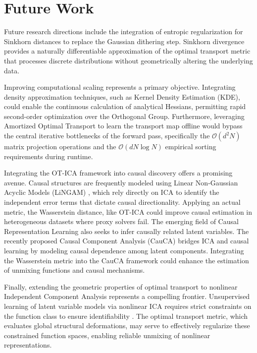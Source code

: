 \documentclass[12pt,a4paper,twoside,openany]{book}
\begin{document}
\section{Future Work}
Future research directions include the integration of entropic regularization for Sinkhorn distances \cite{cuturi2013sinkhorn, peyre2019computational} 
to replace the Gaussian dithering step. Sinkhorn divergence provides a naturally differentiable approximation of the optimal transport metric 
that processes discrete distributions without geometrically altering the underlying data.

Improving computational scaling represents a primary objective. Integrating density approximation techniques, 
such as Kernel Density Estimation (KDE), could enable the continuous calculation of analytical Hessians, 
permitting rapid second-order optimization over the Orthogonal Group. Furthermore, 
leveraging Amortized Optimal Transport to learn the transport map offline would bypass the central 
iterative bottlenecks of the forward pass, specifically the $\mathcal{O}(d^2 N)$ matrix projection operations and 
the $\mathcal{O}(d N \log N)$ empirical sorting requirements during runtime.

Integrating the OT-ICA framework into causal discovery offers a promising avenue. Causal structures are frequently modeled using 
Linear Non-Gaussian Acyclic Models (LiNGAM) \cite{shimizu2006linear}, which rely directly on ICA to identify the independent error terms 
that dictate causal directionality. Applying an actual metric, the Wasserstein distance, like OT-ICA could improve causal estimation in heterogeneous 
datasets where proxy solvers fail. The emerging field of Causal Representation Learning also seeks to infer causally 
related latent variables. The recently proposed Causal Component Analysis (CauCA) \cite{liang2023causal} bridges ICA and causal learning by modeling 
causal dependence among latent components. Integrating the Wasserstein metric into the CauCA framework could 
enhance the estimation of unmixing functions and causal mechanisms.

Finally, extending the geometric properties of optimal transport to nonlinear Independent Component Analysis represents a compelling frontier. 
Unsupervised learning of latent variable models via nonlinear ICA requires strict constraints on the function class to 
ensure identifiability \cite{buchholz2022function}. The optimal transport metric, which evaluates global structural deformations, 
may serve to effectively regularize these constrained function spaces, enabling reliable unmixing of nonlinear representations.
\end{document}
